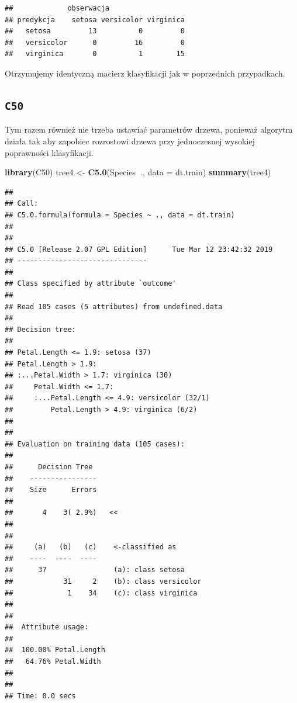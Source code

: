 \documentclass[]{book}
\newenvironment{Shaded}{\begin{snugshade}}{\end{snugshade}}
\newcommand{\DataTypeTok}[1]{\textcolor[rgb]{0.13,0.29,0.53}{#1}}
\newcommand{\KeywordTok}[1]{\textcolor[rgb]{0.13,0.29,0.53}{\textbf{#1}}}
\newcommand{\NormalTok}[1]{#1}
\newcommand{\OperatorTok}[1]{\textcolor[rgb]{0.81,0.36,0.00}{\textbf{#1}}}
\newcommand{\StringTok}[1]{\textcolor[rgb]{0.31,0.60,0.02}{#1}}
\theoremstyle{plain}
\theoremstyle{definition}
\begin{document}
\begin{verbatim}
##             obserwacja
## predykcja    setosa versicolor virginica
##   setosa         13          0         0
##   versicolor      0         16         0
##   virginica       0          1        15
\end{verbatim}

Otrzymujemy identyczną macierz klasyfikacji jak w poprzednich przypadkach.

\hypertarget{c50}{%
\subsection{\texorpdfstring{\texttt{C50}}{C50}}\label{c50}}

Tym razem również nie trzeba ustawiać parametrów drzewa, ponieważ algorytm działa tak aby zapobiec rozrostowi drzewa przy jednoczesnej wysokiej poprawności klasyfikacji.

\begin{Shaded}
\begin{Highlighting}[]
\KeywordTok{library}\NormalTok{(C50)}
\NormalTok{tree4 <-}\StringTok{ }\KeywordTok{C5.0}\NormalTok{(Species}\OperatorTok{~}\NormalTok{., }\DataTypeTok{data =}\NormalTok{ dt.train)}
\KeywordTok{summary}\NormalTok{(tree4)}
\end{Highlighting}
\end{Shaded}

\begin{verbatim}
## 
## Call:
## C5.0.formula(formula = Species ~ ., data = dt.train)
## 
## 
## C5.0 [Release 2.07 GPL Edition]      Tue Mar 12 23:42:32 2019
## -------------------------------
## 
## Class specified by attribute `outcome'
## 
## Read 105 cases (5 attributes) from undefined.data
## 
## Decision tree:
## 
## Petal.Length <= 1.9: setosa (37)
## Petal.Length > 1.9:
## :...Petal.Width > 1.7: virginica (30)
##     Petal.Width <= 1.7:
##     :...Petal.Length <= 4.9: versicolor (32/1)
##         Petal.Length > 4.9: virginica (6/2)
## 
## 
## Evaluation on training data (105 cases):
## 
##      Decision Tree   
##    ----------------  
##    Size      Errors  
## 
##       4    3( 2.9%)   <<
## 
## 
##     (a)   (b)   (c)    <-classified as
##    ----  ----  ----
##      37                (a): class setosa
##            31     2    (b): class versicolor
##             1    34    (c): class virginica
## 
## 
##  Attribute usage:
## 
##  100.00% Petal.Length
##   64.76% Petal.Width
## 
## 
## Time: 0.0 secs
\end{verbatim}
\end{document}
